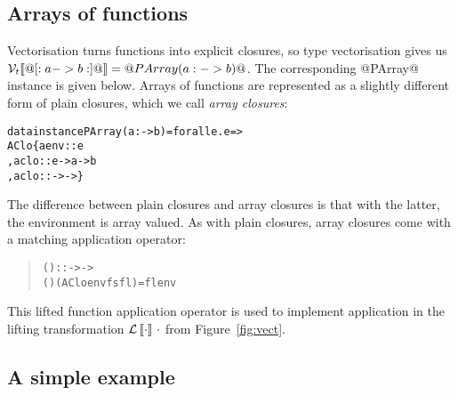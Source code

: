\subsection{Arrays of functions}
\label{sec:arrays-of-functions}

Vectorisation turns functions into explicit closures, so type vectorisation gives us \(\mathcal{V}_t\llbracket @[:a -> b:]@ \rrbracket = @PArray (a :-> b)@\). The corresponding @PArray@ instance is given below. Arrays of functions are represented as a slightly different form of plain closures, which we call \emph{array closures}:
%
\begin{alltt}
 data instance PArray (a :-> b) = forall e. \pacls e => 
   AClo \{ aenv  :: \pa e
        , aclo :: e -> a -> b
        , aclo ::  ->  ->  \}
\end{alltt}
%
The difference between plain closures and array closures is that with the latter, the environment is array valued. As with plain closures, array closures come with a matching application operator:
%
\begin{quote}
\begin{alltt}
(\LV{\capp}) ::  ->  -> 
(\LV{\capp}) (AClo env fs fl) = fl env
\end{alltt}
\end{quote}
%
This lifted function application operator is used to implement application in the lifting transformation \(\mathcal{L}\left\llbracket \cdot \right\rrbracket\,\cdot\) from Figure~\ref{fig:vect}.


\subsection{A simple example}

